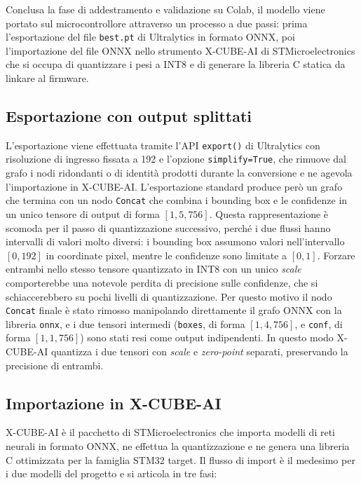 Conclusa la fase di addestramento e validazione su Colab, il modello viene portato sul microcontrollore attraverso un processo a due passi: prima l'esportazione del file \texttt{best.pt} di Ultralytics in formato ONNX, poi l'importazione del file ONNX nello strumento X-CUBE-AI di STMicroelectronics che si occupa di quantizzare i pesi a INT8 e di generare la libreria C statica da linkare al firmware.
 
\subsection{Esportazione con output splittati}
\label{sec:export-split}
 
L'esportazione viene effettuata tramite l'API \texttt{export()} di Ultralytics con risoluzione di ingresso fissata a 192 e l'opzione \texttt{simplify=True}, che rimuove dal grafo i nodi ridondanti o di identità prodotti durante la conversione e ne agevola l'importazione in X-CUBE-AI. L'esportazione standard produce però un grafo che termina con un nodo \texttt{Concat} che combina i bounding box e le confidenze in un unico tensore di output di forma $[1, 5, 756]$. Questa rappresentazione è scomoda per il passo di quantizzazione successivo, perché i due flussi hanno intervalli di valori molto diversi: i bounding box assumono valori nell'intervallo $[0, 192]$ in coordinate pixel, mentre le confidenze sono limitate a $[0, 1]$. Forzare entrambi nello stesso tensore quantizzato in INT8 con un unico \textit{scale} comporterebbe una notevole perdita di precisione sulle confidenze, che si schiaccerebbero su pochi livelli di quantizzazione. Per questo motivo il nodo \texttt{Concat} finale è stato rimosso manipolando direttamente il grafo ONNX con la libreria \texttt{onnx}, e i due tensori intermedi (\texttt{boxes}, di forma $[1, 4, 756]$, e \texttt{conf}, di forma $[1, 1, 756]$) sono stati resi come output indipendenti. In questo modo X-CUBE-AI quantizza i due tensori con \textit{scale} e \textit{zero-point} separati, preservando la precisione di entrambi.
 
\subsection{Importazione in X-CUBE-AI}
\label{sec:cube-import}
 
X-CUBE-AI è il pacchetto di STMicroelectronics che importa modelli di reti neurali in formato ONNX, ne effettua la quantizzazione e ne genera una libreria C ottimizzata per la famiglia STM32 target. Il flusso di import è il medesimo per i due modelli del progetto e si articola in tre fasi:
 
